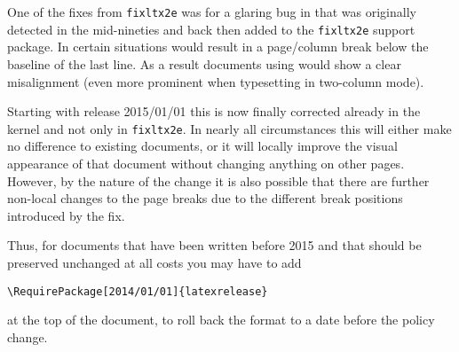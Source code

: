\documentclass{ltnews}
\providecommand\pkg[1]{\texttt{#1}}
\begin{document}
One of the fixes from \pkg{fixltx2e} was for a glaring bug in
 that was originally detected in the mid-nineties and
back then added to the \pkg{fixltx2e} support package. In certain
situations  would result in a page/column break below
the baseline of the last line. As a result documents using
 would show a clear misalignment (even more prominent
when typesetting in two-column mode).

Starting with release 2015/01/01 this is now finally corrected already
in the kernel and not only in \pkg{fixltx2e}.  In nearly all
circumstances this will either make no difference to existing
documents, or it will locally improve the visual appearance of that
document without changing anything on other pages.  However, by the
nature of the change it is also possible that there are further
non-local changes to the page breaks due to the different break
positions introduced by the fix.

Thus, for documents that have been written before 2015 and that should
be preserved unchanged at all costs you may have to add
\begin{verbatim}
\RequirePackage[2014/01/01]{latexrelease}
\end{verbatim}
at the top of the document, to roll back the format to a date before
the policy change.
\end{document}
